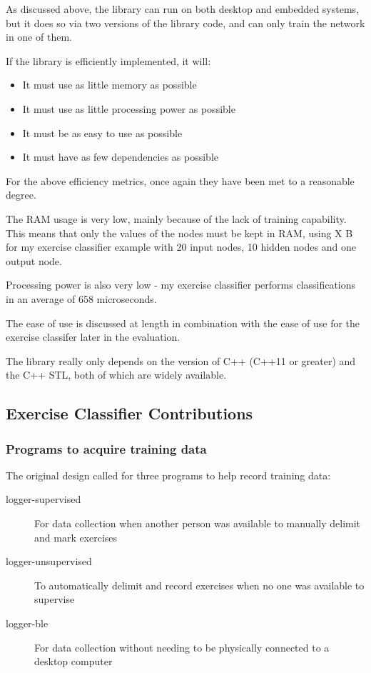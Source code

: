 \documentclass[a4paper]{article}
\begin{document}
As discussed above, the library can run on both desktop and embedded systems, but it does so via two versions of the library code, and can only train the network in one of them.

If the library is efficiently implemented, it will:

\begin{itemize}
\item It must use as little memory as possible
\item It must use as little processing power as possible
\item It must be as easy to use as possible
\item It must have as few dependencies as possible
\end{itemize}

For the above efficiency metrics, once again they have been met to a reasonable degree. 

The RAM usage is very low, mainly because of the lack of training capability. This means that only the values of the nodes must be kept in RAM, using X B for my exercise classifier example with 20 input nodes, 10 hidden nodes and one output node. 

Processing power is also very low - my exercise classifier performs classifications in an average of 658 microseconds\cite{dsref0}. 

The ease of use is discussed at length in combination with the ease of use for the exercise classifer later in the evaluation.

The library really only depends on the version of C++ (C++11 or greater) and the C++ STL, both of which are widely available. 

\subsection{Exercise Classifier Contributions}%

\subsubsection{Programs to acquire training data}

The original design called for three programs to help record training data:


\begin{description}
\item[logger-supervised] For data collection when another person was available to manually delimit and mark exercises
\item[logger-unsupervised] To automatically delimit and record exercises when no one was available to supervise
\item[logger-ble] For data collection without needing to be physically connected to a desktop computer
\end{description}
\end{document}
